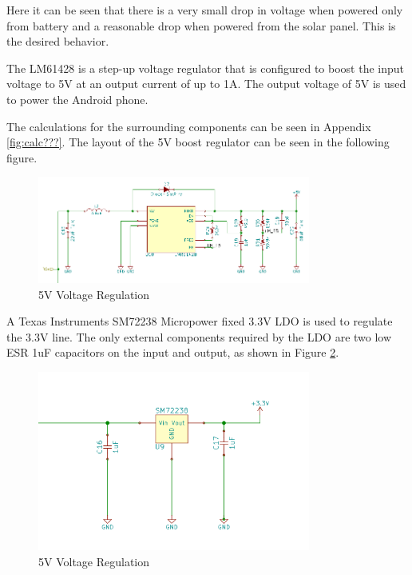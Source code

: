 \documentclass{article}
\numberwithin{figure}{section}
\numberwithin{equation}{section}
\begin{document}
{Here it can be seen that there is a very small drop in voltage when powered only from battery and a reasonable drop when powered from the solar panel. This is the desired behavior.

\bigskip
The LM61428 is a step-up voltage regulator that is configured to boost the input voltage to 5V at an output current of up to 1A. The output voltage of 5V is used to power the Android phone.


\bigskip
The calculations for the surrounding components can be seen in Appendix \ref{fig:calc???}. The layout of the 5V boost regulator can be seen in the following figure.
\begin{figure}[H]
	\centering
	\includegraphics[width=0.8\textwidth]{PS5V}
	\caption{5V Voltage Regulation}
	\label{fig:ps5}
\end{figure}

\bigskip
A Texas Instruments SM72238 Micropower fixed 3.3V LDO is used to regulate the 3.3V line. The only external components required by the LDO are two low ESR 1uF capacitors on the input and output, as shown in Figure \ref{fig:ps3}.

\begin{figure}[H]
	\centering
	\includegraphics[width=0.8\textwidth]{PS3V}
	\caption{5V Voltage Regulation}
	\label{fig:ps3}
\end{figure}


}
\end{document}
